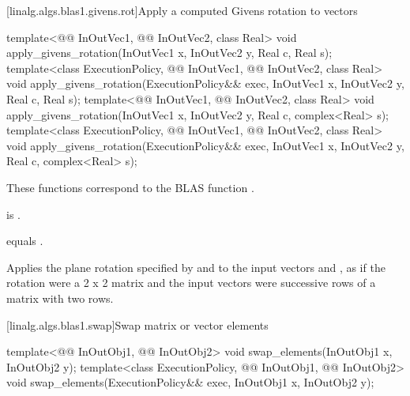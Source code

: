 [linalg.algs.blas1.givens.rot]{Apply a computed Givens rotation to vectors}

%
\begin{itemdecl}
template<@@ InOutVec1, @@ InOutVec2, class Real>
  void apply_givens_rotation(InOutVec1 x, InOutVec2 y, Real c, Real s);
template<class ExecutionPolicy, @@ InOutVec1, @@ InOutVec2, class Real>
  void apply_givens_rotation(ExecutionPolicy&& exec,
                             InOutVec1 x, InOutVec2 y, Real c, Real s);
template<@@ InOutVec1, @@ InOutVec2, class Real>
  void apply_givens_rotation(InOutVec1 x, InOutVec2 y, Real c, complex<Real> s);
template<class ExecutionPolicy, @@ InOutVec1, @@ InOutVec2, class Real>
  void apply_givens_rotation(ExecutionPolicy&& exec,
                             InOutVec1 x, InOutVec2 y, Real c, complex<Real> s);
\end{itemdecl}

\begin{itemdescr}
\pnum
\begin{note}
These functions correspond to the BLAS function \supercite{blas1}.
\end{note}

\pnum
\mandates
{} is .

\pnum
\expects
{} equals .

\pnum
\effects
Applies the plane rotation
specified by  and  to
the input vectors  and ,
as if the rotation were a 2 x 2 matrix and
the input vectors were successive rows of a matrix with two rows.
\end{itemdescr}

[linalg.algs.blas1.swap]{Swap matrix or vector elements}

%
\begin{itemdecl}
template<@@ InOutObj1, @@ InOutObj2>
  void swap_elements(InOutObj1 x, InOutObj2 y);
template<class ExecutionPolicy, @@ InOutObj1, @@ InOutObj2>
  void swap_elements(ExecutionPolicy&& exec, InOutObj1 x, InOutObj2 y);
\end{itemdecl}

